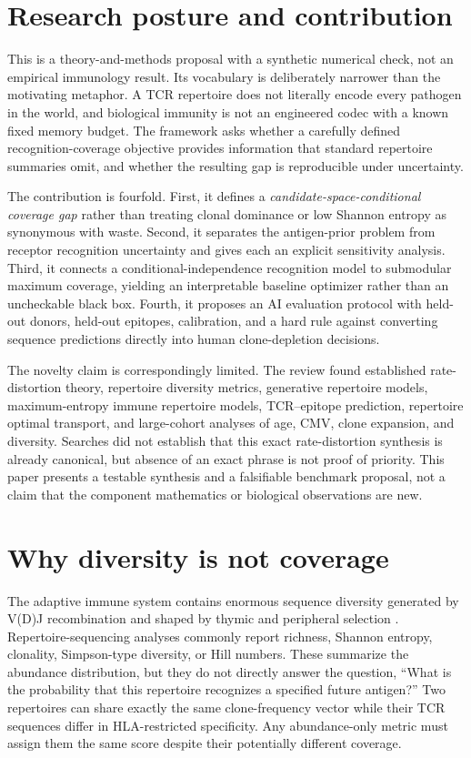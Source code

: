 \documentclass[11pt]{article}
\begin{document}
\section{Research posture and contribution}
This is a theory-and-methods proposal with a synthetic numerical check, not an empirical immunology result. Its vocabulary is deliberately narrower than the motivating metaphor. A TCR repertoire does not literally encode every pathogen in the world, and biological immunity is not an engineered codec with a known fixed memory budget. The framework asks whether a carefully defined recognition-coverage objective provides information that standard repertoire summaries omit, and whether the resulting gap is reproducible under uncertainty.

The contribution is fourfold. First, it defines a \emph{candidate-space-conditional coverage gap} rather than treating clonal dominance or low Shannon entropy as synonymous with waste. Second, it separates the antigen-prior problem from receptor recognition uncertainty and gives each an explicit sensitivity analysis. Third, it connects a conditional-independence recognition model to submodular maximum coverage, yielding an interpretable baseline optimizer rather than an uncheckable black box. Fourth, it proposes an AI evaluation protocol with held-out donors, held-out epitopes, calibration, and a hard rule against converting sequence predictions directly into human clone-depletion decisions.

The novelty claim is correspondingly limited. The review found established rate-distortion theory, repertoire diversity metrics, generative repertoire models, maximum-entropy immune repertoire models, TCR--epitope prediction, repertoire optimal transport, and large-cohort analyses of age, CMV, clone expansion, and diversity. Searches did not establish that this exact rate-distortion synthesis is already canonical, but absence of an exact phrase is not proof of priority. This paper presents a testable synthesis and a falsifiable benchmark proposal, not a claim that the component mathematics or biological observations are new.

\section{Why diversity is not coverage}
The adaptive immune system contains enormous sequence diversity generated by V(D)J recombination and shaped by thymic and peripheral selection \citep{Murugan2012,Elhanati2014,ElhanatiSelection2014,Olson2022}. Repertoire-sequencing analyses commonly report richness, Shannon entropy, clonality, Simpson-type diversity, or Hill numbers. These summarize the abundance distribution, but they do not directly answer the question, ``What is the probability that this repertoire recognizes a specified future antigen?'' Two repertoires can share exactly the same clone-frequency vector while their TCR sequences differ in HLA-restricted specificity. Any abundance-only metric must assign them the same score despite their potentially different coverage.
\end{document}
